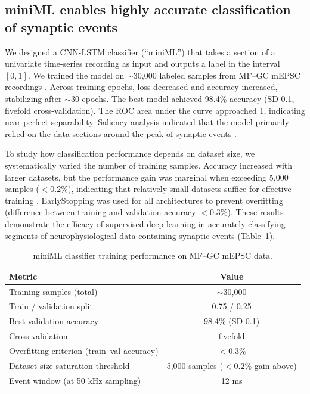 \documentclass[9pt,lineno]{article}
\begin{document}
\subsection{miniML enables highly accurate classification of synaptic events}

We designed a CNN-LSTM classifier (``miniML'') that takes a section of a univariate time-series recording as input and outputs a label in the interval $[0, 1]$. We trained the model on $\sim$30{,}000 labeled samples from MF--GC mEPSC recordings \citep{Delvendahl2019}. Across training epochs, loss decreased and accuracy increased, stabilizing after $\sim$30 epochs. The best model achieved 98.4\% accuracy (SD 0.1, fivefold cross-validation). The ROC area under the curve approached 1, indicating near-perfect separability. Saliency analysis indicated that the model primarily relied on the data sections around the peak of synaptic events \citep{Simonyan2013}.

To study how classification performance depends on dataset size, we systematically varied the number of training samples. Accuracy increased with larger datasets, but the performance gain was marginal when exceeding 5{,}000 samples ($<0.2\%$), indicating that relatively small datasets suffice for effective training \citep{Bailly2022}. EarlyStopping was used for all architectures to prevent overfitting (difference between training and validation accuracy $<0.3\%$). These results demonstrate the efficacy of supervised deep learning in accurately classifying segments of neurophysiological data containing synaptic events (Table~\ref{tab:classification}).

\begin{table}[ht]
\centering
\caption{miniML classifier training performance on MF--GC mEPSC data.}
\label{tab:classification}
\begin{tabular}{lc}
\toprule
Metric & Value \\
\midrule
Training samples (total) & $\sim$30{,}000 \\
Train / validation split & 0.75 / 0.25 \\
Best validation accuracy & 98.4\% (SD 0.1) \\
Cross-validation & fivefold \\
Overfitting criterion (train--val accuracy) & $<0.3\%$ \\
Dataset-size saturation threshold & 5{,}000 samples ($<0.2\%$ gain above) \\
Event window (at 50 kHz sampling) & 12 ms \\
\bottomrule
\end{tabular}
\end{table}
\end{document}
